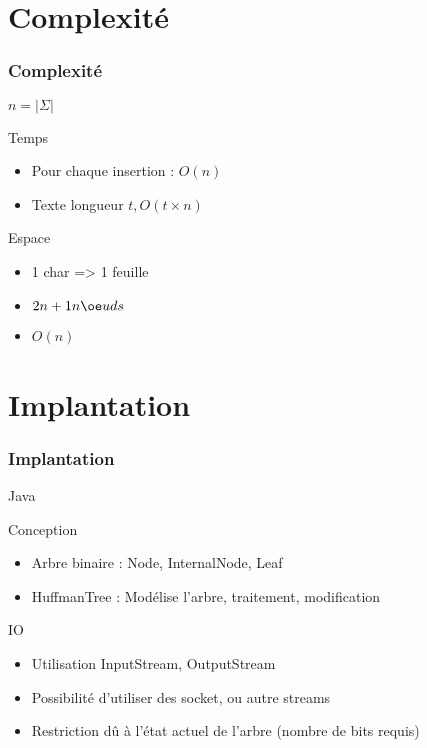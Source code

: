 \documentclass[12pt,francais]{beamer}
\begin{document}
\section{Complexité}
\begin{frame}
  \frametitle{Complexité}
        \vspace{-1cm}
        \center $n = |\Sigma|$
  \begin{block}{Temps}
    \begin{itemize}
      \item Pour chaque insertion : $O(n)$
      \item Texte longueur $t, O(t \times n)$
    \end{itemize}
  \end{block}
  \begin{block}{Espace}
    \begin{itemize}
      \item 1 char => 1 feuille
      \item $2n + 1 n\oe uds$
      \item $O(n)$
    \end{itemize}
  \end{block}
\end{frame}

\section{Implantation}
\begin{frame}
  \frametitle{Implantation}
        \vspace{-1cm}
        \center Java
  \begin{block}{Conception}
    \begin{itemize}
      \item Arbre binaire : Node, InternalNode, Leaf
      \item HuffmanTree : Modélise l'arbre, traitement, modification
    \end{itemize}
  \end{block}
  \begin{block}{IO}
    \begin{itemize}
      \item Utilisation InputStream, OutputStream
      \item Possibilité d'utiliser des socket, ou autre streams
      \item Restriction dû à l'état actuel de l'arbre (nombre de bits requis)
    \end{itemize}
  \end{block}
\end{frame}
\end{document}
